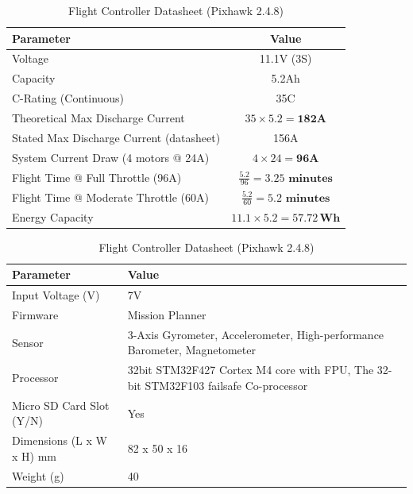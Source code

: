 \documentclass[12pt]{report}
\begin{document}
      \begin{table}[h!]
      \centering
      \caption{Battery Datasheet (Orange 11.1V 5200mAh 3S)}
        \begin{tabular}{|l|c|}
          \hline
          \textbf{Parameter} & \textbf{Value} \\
          \hline
          Voltage & 11.1V (3S) \\
          \hline
          Capacity & 5.2Ah \\
          \hline
          C-Rating (Continuous) & 35C \\
          \hline
          Theoretical Max Discharge Current & $35 \times 5.2 = \mathbf{182A}$ \\
          \hline
          Stated Max Discharge Current (datasheet) & 156A \\
          \hline
          System Current Draw (4 motors @ 24A) & $4 \times 24 = \mathbf{96A}$ \\
          \hline
              Flight Time @ Full Throttle (96A) & $\frac{5.2}{96} = \mathbf{3.25 \text{ minutes}}$ \\
          \hline
          Flight Time @ Moderate Throttle (60A) & $\frac{5.2}{60} = \mathbf{5.2 \text{ minutes}}$ \\
          \hline
          Energy Capacity & $11.1 \times 5.2 = \mathbf{57.72\,Wh}$ \\
          \hline
        \end{tabular}
      
        \caption{Flight Controller Datasheet (Pixhawk 2.4.8)}
        \begin{tabular}{|l|p{6cm}|}
          \hline
          \textbf{Parameter} & \textbf{Value} \\
          \hline
          Input Voltage (V)	& 7V \\
          Firmware	   &   Mission Planner \\
          Sensor	 &  {\small 3-Axis Gyrometer, Accelerometer, High-performance Barometer, Magnetometer} \\
          Processor	 &    {\small 32bit STM32F427 Cortex M4 core with FPU, The 32-bit STM32F103 failsafe Co-processor} \\
          Micro SD Card Slot (Y/N)	    &   Yes \\
          Dimensions {\small (L x W x H) mm}	   &   82 x 50 x 16 \\
          Weight (g)	 &    40 \\
          \hline
        \end{tabular}
      \end{table}
\end{document}
